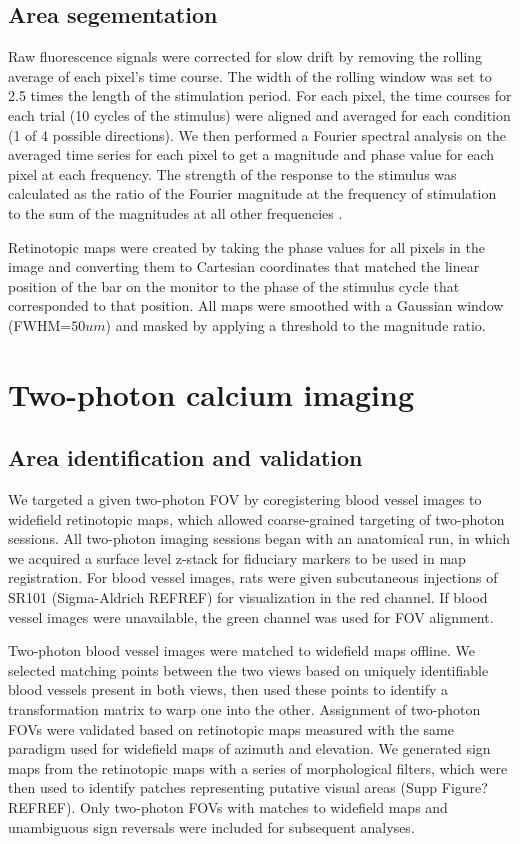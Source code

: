 \subsection{Area segementation}
Raw fluorescence signals were corrected for slow drift by removing the rolling average of each pixel’s time course. The width of the rolling window was set to 2.5 times the length of the stimulation period. For each pixel, the time courses for each trial (10 cycles of the stimulus) were aligned and averaged for each condition (1 of 4 possible directions). We then performed a Fourier spectral analysis on the averaged time series for each pixel to get a magnitude and phase value for each pixel at each frequency. The strength of the response to the stimulus was calculated as the ratio of the Fourier magnitude at the frequency of stimulation to the sum of the magnitudes at all other frequencies \cite{Kalatsky2003, OTHERS}.

Retinotopic maps were created by taking the phase values for all pixels in the image and converting them to Cartesian coordinates that matched the linear position of the bar on the monitor to the phase of the stimulus cycle that corresponded to that position. All maps were smoothed with a Gaussian window (FWHM=$50um$) and masked by applying a threshold to the magnitude ratio.  

\section{Two-photon calcium imaging}

\subsection{Area identification and validation}
We targeted a given two-photon FOV by coregistering blood vessel images to widefield retinotopic maps, which allowed coarse-grained targeting of two-photon sessions. All two-photon imaging sessions began with an anatomical run, in which we acquired a surface level z-stack for fiduciary markers to be used in map registration. For blood vessel images, rats were given subcutaneous injections of SR101 (Sigma-Aldrich REFREF) for visualization in the red channel. If blood vessel images were unavailable, the green channel was used for FOV alignment. 

Two-photon blood vessel images were matched to widefield maps offline. We selected matching points between the two views based on uniquely identifiable blood vessels present in both views, then used these points to identify a transformation matrix to warp one into the other. Assignment of two-photon FOVs were validated based on retinotopic maps measured with the same paradigm used for widefield maps of azimuth and elevation. We generated sign maps from the retinotopic maps with a series of morphological filters\cite{Marshel2011, Garrett2014, Zhuang2017}, which were then used to identify patches representing putative visual areas (Supp Figure? REFREF). Only two-photon FOVs with matches to widefield maps and unambiguous sign reversals were included for subsequent analyses. 

